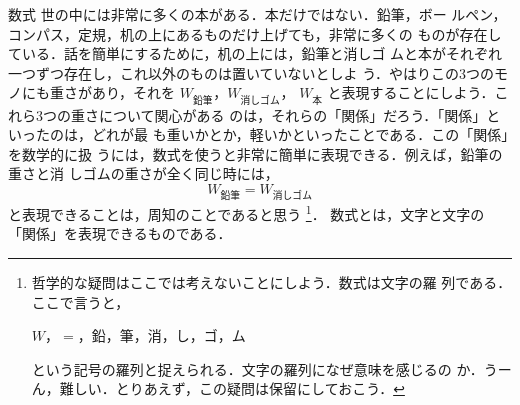         \begin{mysmallsec}{数式}
            世の中には非常に多くの本がある．本だけではない．鉛筆，ボー
            ルペン，コンパス，定規，机の上にあるものだけ上げても，非常に多くの
            ものが存在している．話を簡単にするために，机の上には，鉛筆と消しゴ
            ムと本がそれぞれ一つずつ存在し，これ以外のものは置いていないとしよ
            う．やはりこの3つのモノにも重さがあり，それを $W_{\mbox{鉛筆}}$，$W_{\mbox{消しゴム}}$，
            $W_{\mbox{本}}$ と表現することにしよう．これら3つの重さについて関心がある
            のは，それらの「関係」だろう．「関係」といったのは，どれが最
            も重いかとか，軽いかといったことである．この「関係」を数学的に扱
            うには，数式を使うと非常に簡単に表現できる．例えば，鉛筆の重さと消
            しゴムの重さが全く同じ時には，
                \begin{equation*}
                    W_{\mbox{鉛筆}} = W_{\mbox{消しゴム}}
                \end{equation*}
            と表現できることは，周知のことであると思う
                \footnote{
                    哲学的な疑問はここでは考えないことにしよう．数式は文字の羅
                    列である．ここで言うと，
                        \begin{center}
                            $W$，$=$，鉛，筆，消，し，ゴ，ム
                        \end{center}
                    という記号の羅列と捉えられる．文字の羅列になぜ意味を感じるの
                    か．うーん，難しい．とりあえず，この疑問は保留にしておこう．
                }．
            数式とは，文字と文字の「関係」を表現できるものである．
        \end{mysmallsec}

